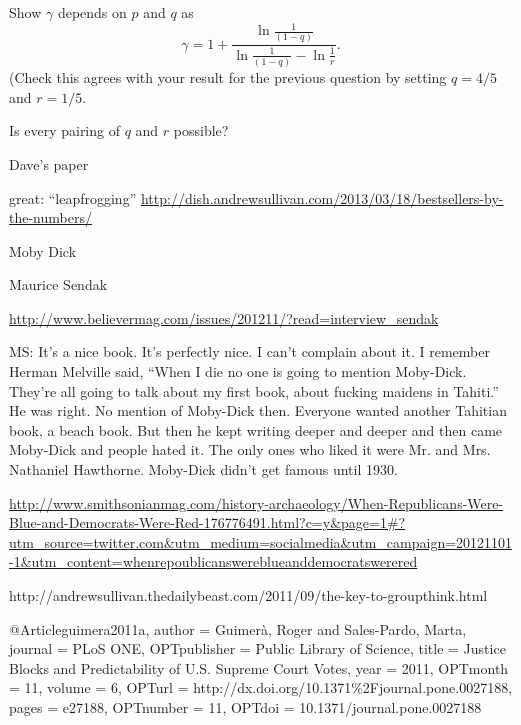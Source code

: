     Show $\gamma$ depends on $p$ and $q$ as 
    $$
    \gamma
    =
    1 +
    \frac{\ln \frac{1}{(1-q)}}
      {\ln\frac{1}{(1-q)} - \ln \frac{1}{r}}.
    $$
    (Check this agrees with your result
    for the previous question by setting
    $q=4/5$ and $r=1/5$.

    Is every pairing of $q$ and $r$ possible?

Dave's paper






great:
``leapfrogging''
\url{http://dish.andrewsullivan.com/2013/03/18/bestsellers-by-the-numbers/}


Moby Dick

Maurice Sendak

\url{http://www.believermag.com/issues/201211/?read=interview\_sendak}

MS: It's a nice book. It's perfectly nice. I can't complain about
it. I remember Herman Melville said, ``When I die no one is going to
mention Moby-Dick. They're all going to talk about my first book,
about fucking maidens in Tahiti.'' He was right. No mention of
Moby-Dick then. Everyone wanted another Tahitian book, a beach
book. But then he kept writing deeper and deeper and then came
Moby-Dick and people hated it. The only ones who liked it were Mr. and
Mrs. Nathaniel Hawthorne. Moby-Dick didn't get famous until 1930.


\url{http://www.smithsonianmag.com/history-archaeology/When-Republicans-Were-Blue-and-Democrats-Were-Red-176776491.html?c=y\&page=1#?utm\_source=twitter.com\&utm\_medium=socialmedia\&utm\_campaign=20121101-1\&utm\_content=whenrepoublicanswereblueanddemocratswerered}



http://andrewsullivan.thedailybeast.com/2011/09/the-key-to-groupthink.html

@Article{guimera2011a,
  author =       {Guimer\`{a}, Roger and Sales-Pardo, Marta},
  journal =      {PLoS ONE},
  OPTpublisher = {Public Library of Science},
  title =        {Justice Blocks and Predictability of U.S. Supreme
                  Court Votes},
  year =         {2011},
  OPTmonth =     {11},
  volume =       {6},
  OPTurl =       {http://dx.doi.org/10.1371\%2Fjournal.pone.0027188},
  pages =        {e27188},
  OPTnumber =    {11},
  OPTdoi =       {10.1371/journal.pone.0027188}
}        

